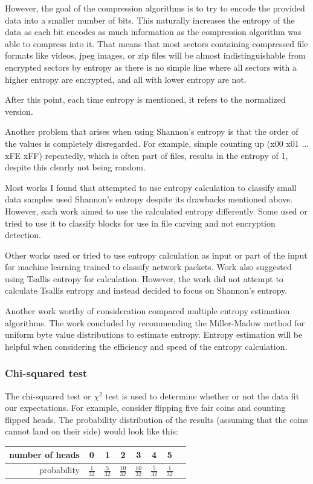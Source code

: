\documentclass[
  digital, %
  color,   %
  oneside, %
  lof,     %
  nolot,     %
]{fithesis4}
\begin{document}
However, the goal of the compression algorithms is to try to encode the provided data into a smaller number of bits.
This naturally increases the entropy of the data as each bit encodes as much information as the compression algorithm was able to compress into it.
That means that most sectors containing compressed file formats like videos, jpeg images, or zip files will be almost indistinguishable from encrypted sectors by entropy as there is no simple line where all sectors with a higher entropy are encrypted, and all with lower entropy are not.

After this point, each time entropy is mentioned, it refers to the normalized version.

Another problem that arises when using Shannon's entropy is that the order of the values is completely disregarded. For example, simple counting up (x00 x01 ... xFE xFF) repeatedly, which is often part of files, results in the entropy of 1, despite this clearly not being random. 

Most works I found that attempted to use entropy calculation to classify small data samples used Shannon's entropy despite its drawbacks mentioned above.
However, each work aimed to use the calculated entropy differently.
Some used\cite{foster12} or tried to use\cite{garfmccar15} it to classify blocks for use in file carving and not encryption detection.

Other works used\cite{wazhguli11} or tried to use\cite{bebapeshrara18} entropy calculation as input or part of the input for machine learning trained to classify network packets.
Work\cite{wazhguli11} also suggested using Tsallis entropy for calculation.
However, the work did not attempt to calculate Tsallis entropy and instead decided to focus on Shannon's entropy.

Another work worthy of consideration\cite{fiallegon19} compared multiple entropy estimation algorithms.
The work concluded by recommending the Miller-Madow method for uniform byte value distributions to estimate entropy.
Entropy estimation will be helpful when considering the efficiency and speed of the entropy calculation.

\subsubsection{Chi-squared test}
\label{sss:chi2-test}

The chi-squared test or $\chi^2$ test is used to determine whether or not the data fit our expectations.\cite{pearson00}
For example, consider flipping five fair coins and counting flipped heads.
The probability distribution of the results (assuming that the coins cannot land on their side) would look like this:
\begin{center}
    \begin{tabular}{ r | c c c c c c c }
        number of heads & 0 & 1 & 2 & 3 & 4 & 5 \\ \hline
        probability & $\frac{1}{32}$ & $\frac{5}{32}$ & $\frac{10}{32}$ & $\frac{10}{32}$ & $\frac{5}{32}$ & $\frac{1}{32}$
    \end{tabular}
\end{center}
\end{document}
